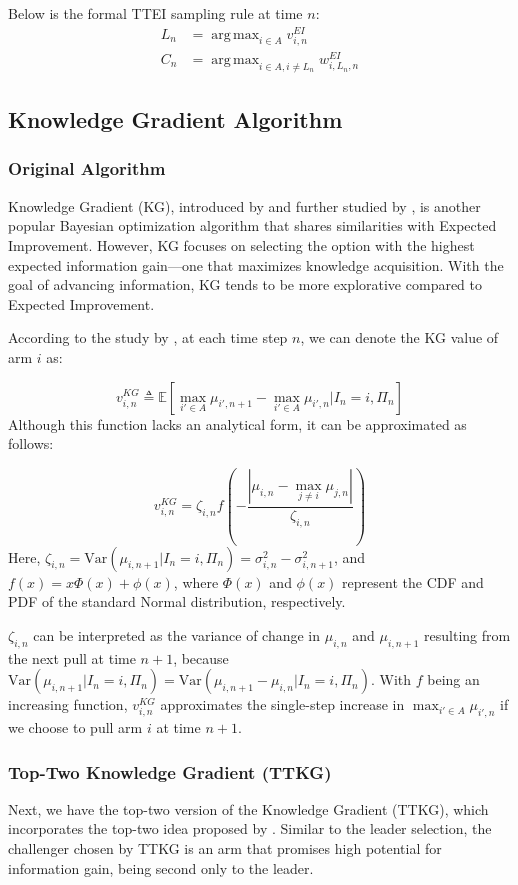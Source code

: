 \documentclass[a4paper, 12pt]{article}
\DeclareMathOperator{\argmax}{arg\,max}
\theoremstyle{definition}
\begin{document}
Below is the formal TTEI sampling rule at time $n$:
\begin{align} \label{eq:ttei}
L_n & = \argmax_{i\in A} v_{i,n}^{EI} \nonumber \\
C_n & = \argmax_{i\in A,i\neq L_n} w_{i,L_n,n}^{EI}
\end{align}


\subsection{Knowledge Gradient Algorithm}
\subsubsection{Original Algorithm}
Knowledge Gradient (KG), introduced by \cite{knowledgegradient1} and further studied by \cite{knowledgegradient2}, is another popular Bayesian optimization algorithm that shares similarities with Expected Improvement. However, KG focuses on selecting the option with the highest expected information gain—one that maximizes knowledge acquisition. With the goal of advancing information, KG tends to be more explorative compared to Expected Improvement.

According to the study by \cite{kg}, at each time step $n$, we can denote the KG value of arm $i$ as:

\[
v_{i,n}^{KG} \triangleq \mathbb{E} \left[\max_{i' \in A} \mu_{i',n+1} - \max_{i' \in A} \mu_{i',n} \bigg| I_n = i, \Pi_n \right]
\]
Although this function lacks an analytical form, it can be approximated as follows:

\[
v_{i,n}^{KG} = \zeta_{i,n} f\left(-\frac{|\mu_{i,n}-\max_{j\neq i} \mu_{j,n}|}{\zeta_{i,n}}\right)
\]
Here, $\zeta_{i,n} = \mathrm{Var}(\mu_{i,n+1}|I_n = i, \Pi_n) = \sigma_{i,n}^2 - \sigma_{i,n+1}^2$, and $f(x) = x \Phi(x) + \phi(x)$, where $\Phi(x)$ and $\phi(x)$ represent the CDF and PDF of the standard Normal distribution, respectively.

$\zeta_{i,n}$ can be interpreted as the variance of change in $\mu_{i,n}$ and $\mu_{i,n+1}$ resulting from the next pull at time $n+1$, because $\mathrm{Var}(\mu_{i,n+1}|I_n = i, \Pi_n) = \mathrm{Var}(\mu_{i,n+1}- \mu_{i,n}|I_n = i, \Pi_n)$. With $f$ being an increasing function, $v_{i,n}^{KG}$ approximates the single-step increase in $\max_{i'\in A} \mu_{i',n}$ if we choose to pull arm $i$ at time $n+1$.

\subsubsection{Top-Two Knowledge Gradient (TTKG)}
Next, we have the top-two version of the Knowledge Gradient (TTKG), which incorporates the top-two idea proposed by \cite{toptwo}. Similar to the leader selection, the challenger chosen by TTKG is an arm that promises high potential for information gain, being second only to the leader.
\end{document}
